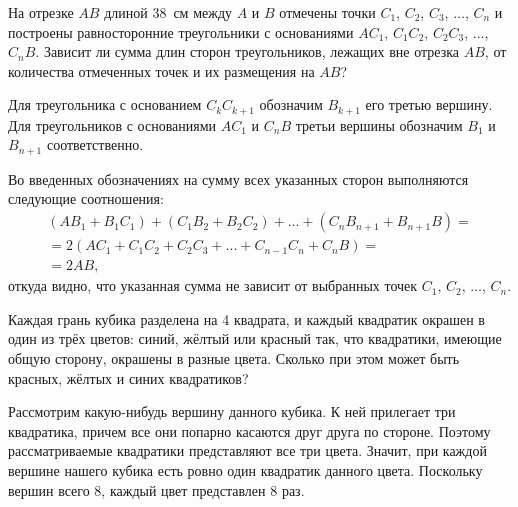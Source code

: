 \begin{itemize}

\itB На отрезке $AB$ длиной \SI{38}{\textrm{см}} между $A$ и $B$ отмечены точки $C_1$, $C_2$, $C_3$, $\dots$, $C_n$ 
и построены равносторонние треугольники с основаниями $AC_1$, $C_1C_2$, $C_2C_3$, $\dots$, $C_nB$. 
Зависит ли сумма длин сторон треугольников, лежащих вне отрезка $AB$, от количества отмеченных точек и их размещения на $AB$?

\itr Для треугольника с основанием $C_{k}C_{k+1}$ обозначим $B_{k+1}$ его третью вершину. Для треугольников с основаниями $AC_1$ и $C_nB$ третьи вершины обозначим $B_1$ и $B_{n+1}$ соответственно. 

\begin{center}\end{center}

Во введенных обозначениях на сумму всех указанных сторон выполняются следующие соотношения:
$$
\begin{array}{l}
(AB_1+B_1C_1)+(C_1B_2+B_2C_2)+...+(C_nB_{n+1}+B_{n+1}B)=\\
=2(AC_1+C_1C_2+C_2C_3+...+C_{n-1}C_n+C_nB)=\\
=2AB,
\end{array}$$
откуда видно, что указанная сумма не зависит от выбранных точек $C_1$, $C_2$, $\dots$, $C_n$.


\itC Каждая грань кубика разделена на 4 квадрата, и каждый квадратик окрашен в один из трёх цветов: синий, жёлтый или красный так, что квадратики, имеющие общую сторону, окрашены в разные цвета. Сколько при этом может быть красных, жёлтых и синих квадратиков?

\itr Рассмотрим какую-нибудь вершину данного кубика. 
К ней прилегает три квадратика, причем все они попарно касаются друг друга по стороне. 
Поэтому рассматриваемые квадратики представляют все три цвета. Значит, при каждой вершине 
нашего кубика есть ровно один квадратик данного цвета. Поскольку вершин всего 8, каждый 
цвет представлен 8 раз.

\end{itemize}

